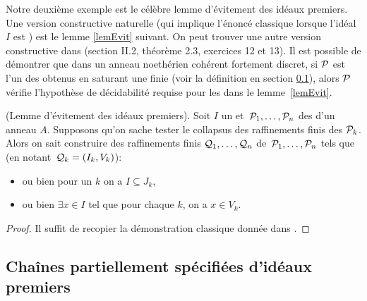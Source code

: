 \ms Notre deuxième exemple est le célèbre lemme d'évitement des 
idéaux premiers. Une version constructive naturelle (qui implique 
l'énoncé classique lorsque l'idéal $I$ est \tf) est le lemme \ref{lemEvit} suivant.
On peut trouver une autre version constructive dans \cite{MRR} (section II.2, théorème 2.3, exercices 12 et 13). 
Il est possible de démontrer que dans un anneau noethérien cohérent fortement 
discret, si ${\cal P}$ est l'un des \prois obtenus en saturant une \proc finie
(voir la définition en section \ref{subsecProc}), 
alors  ${\cal P}$ vérifie l'hypothèse de décidabilité requise pour les 
\prois dans le lemme~\ref{lemEvit}.
\begin{lemma} 
\label{lemEvit} {\rm (Lemme d'évitement des idéaux premiers)}.
Soit $I$ un \itf \hbox{et ${\cal P}_1,\ldots,{\cal P}_n$} des \prois 
d'un anneau $A$. Supposons qu'on sache tester le collapsus des 
raffinements
finis des ${\cal P}_k$.
Alors on sait construire des raffinements finis ${\cal Q}_1,\ldots,{\cal Q}_n$  \hbox{de  
${\cal P}_1,\ldots,{\cal P}_n$} tels que (en notant~\hbox{${\cal Q}_k=(I_k,V_k)$}):  
\begin{itemize}
%
\item ou bien pour un $k$ on a $I\subseteq  J_k$,
%
\item ou 
bien $\exists x\in I$ tel que pour chaque $k$, on a $x\in V_k$. 
%
\end{itemize}
\end{lemma}
\begin{proof}
Il suffit de recopier la démonstration classique donnée dans \cite{Ei}.
\end{proof}




\subsection{Chaînes partiellement spécifiées d'idéaux
premiers} 
\label{subsecProc}



